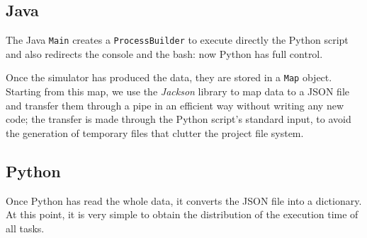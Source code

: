 \subsection{Java}
The Java \texttt{Main} creates a \texttt{ProcessBuilder} to execute directly the Python script and also redirects the console and the bash: now Python has full control.

Once the simulator has produced the data, they are stored in a \texttt{Map} object. Starting from this map, we use the \textit{Jackson} library to map data to a JSON file and transfer them through a pipe in an efficient way without writing any new code; the transfer is made through the Python script's standard input, to avoid the generation of temporary files that clutter the project file system.

\subsection{Python}
Once Python has read the whole data, it converts the JSON file into a dictionary. At this point, it is very simple to obtain the distribution of the execution time of all tasks.
